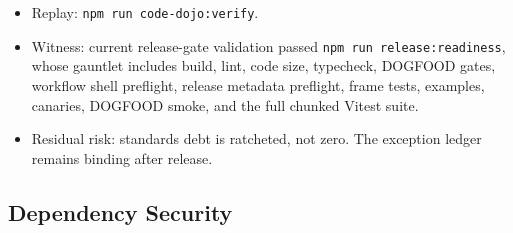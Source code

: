 \begin{itemize}
\item
  Replay: \texttt{n\allowbreak{}p\allowbreak{}m\allowbreak{} \allowbreak{}r\allowbreak{}u\allowbreak{}n\allowbreak{} \allowbreak{}c\allowbreak{}o\allowbreak{}d\allowbreak{}e\allowbreak{}-\allowbreak{}d\allowbreak{}o\allowbreak{}j\allowbreak{}o\allowbreak{}:\allowbreak{}v\allowbreak{}e\allowbreak{}r\allowbreak{}i\allowbreak{}f\allowbreak{}y}.
\item
  Witness: current release-gate validation passed \texttt{n\allowbreak{}p\allowbreak{}m\allowbreak{} \allowbreak{}r\allowbreak{}u\allowbreak{}n\allowbreak{} \allowbreak{}r\allowbreak{}e\allowbreak{}l\allowbreak{}e\allowbreak{}a\allowbreak{}s\allowbreak{}e\allowbreak{}:\allowbreak{}r\allowbreak{}e\allowbreak{}a\allowbreak{}d\allowbreak{}i\allowbreak{}n\allowbreak{}e\allowbreak{}s\allowbreak{}s}, whose gauntlet includes build, lint, code size, typecheck, DOGFOOD gates, workflow shell preflight, release metadata preflight, frame tests, examples, canaries, DOGFOOD smoke, and the full chunked Vitest suite.
\item
  Residual risk: standards debt is ratcheted, not zero. The exception ledger remains binding after release.
\end{itemize}

\subsection{Dependency Security}\label{record-261-dependency-security}

